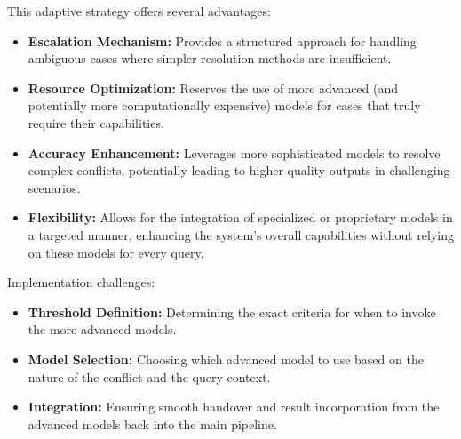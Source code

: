 This adaptive strategy offers several advantages:
\begin{itemize}
    \item \textbf{Escalation Mechanism:} Provides a structured approach for handling ambiguous cases where simpler resolution methods are insufficient.
    \item \textbf{Resource Optimization:} Reserves the use of more advanced (and potentially more computationally expensive) models for cases that truly require their capabilities.
    \item \textbf{Accuracy Enhancement:} Leverages more sophisticated models to resolve complex conflicts, potentially leading to higher-quality outputs in challenging scenarios.
    \item \textbf{Flexibility:} Allows for the integration of specialized or proprietary models in a targeted manner, enhancing the system's overall capabilities without relying on these models for every query.
\end{itemize}

Implementation challenges:
\begin{itemize}
    \item \textbf{Threshold Definition:} Determining the exact criteria for when to invoke the more advanced models.
    \item \textbf{Model Selection:} Choosing which advanced model to use based on the nature of the conflict and the query context.
    \item \textbf{Integration:} Ensuring smooth handover and result incorporation from the advanced models back into the main pipeline.
\end{itemize}

